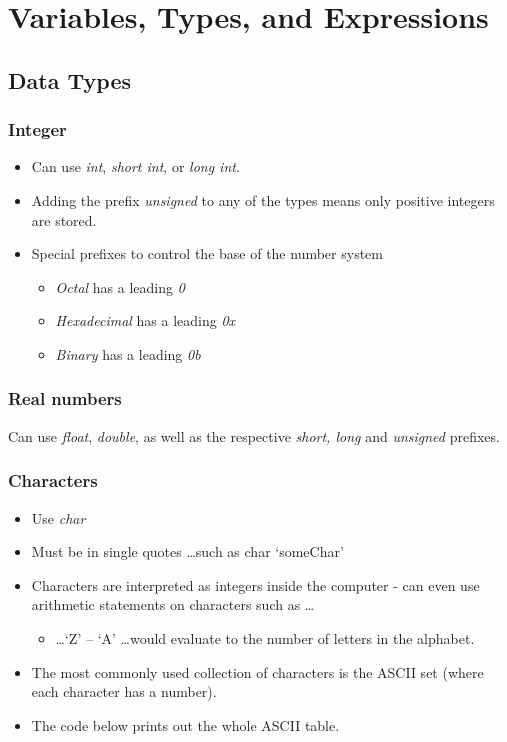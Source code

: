 \section{Variables, Types, and Expressions}

\subsection{Data Types}

\subsubsection*{Integer}
\begin{itemize}
	\item Can use \emph{int}, \emph{short int}, or \emph{long int}.
	\item Adding the prefix \emph{unsigned} to any of the types means only positive integers are stored.
	\item Special prefixes to control the base of the number system
	\begin{itemize}
		\item \emph{Octal} has a leading \emph{0}
		\item \emph{Hexadecimal} has a leading \emph{0x}
		\item \emph{Binary} has a leading \emph{0b}
	\end{itemize}
\end{itemize}


\subsubsection*{Real numbers}
Can use \emph{float}, \emph{double}, as well as the respective \emph{short, long} and
\emph{unsigned} prefixes.


\subsubsection*{Characters}
\begin{itemize}
	\item Use \emph{char}
	\item Must be in single quotes \ldots such as char `someChar'
	\item Characters are interpreted as integers inside the computer - can even use arithmetic
	statements on characters such as \ldots
	\begin{itemize}
		\item \ldots `Z' -- `A' \ldots would evaluate to the number of letters in the alphabet.
	\end{itemize}
	\item The most commonly used collection of characters is the ASCII set (where each character
	has a number).
	\item The code below prints out the whole ASCII table.
\end{itemize}

